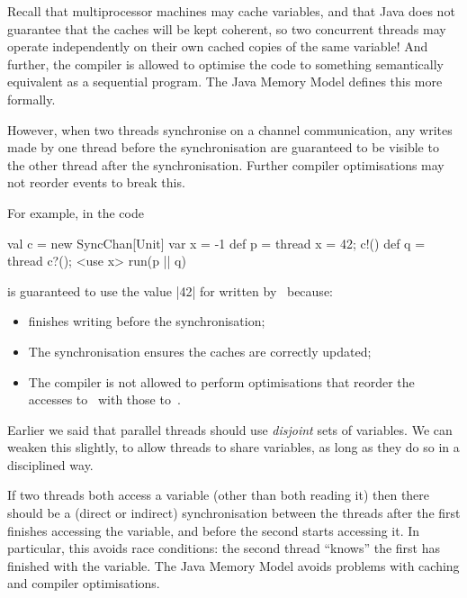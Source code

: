 


Recall that multiprocessor machines may cache variables, and that Java does
not guarantee that the caches will be kept coherent, so two concurrent
threads may operate independently on their own cached copies of the same
variable!  And further, the compiler is allowed to optimise the code to
something semantically equivalent as a sequential program.  The Java Memory
Model
defines this more formally.

However, when two threads synchronise on a channel communication, any writes
made by one thread before the synchronisation are guaranteed to be visible to
the other thread after the synchronisation.  
Further compiler optimisations may not reorder events to break this.



For example, in the code
\begin{scala}
val c = new SyncChan[Unit]
var x = -1
def p = thread{ x = 42; c!() }
def q = thread{ c?(); <use x> }
run(p || q)
\end{scala}
%
 is guaranteed to use the value |42| for  written
by~ because:
%
\begin{itemize}
\item 
{} finishes writing before the synchronisation;

\item
The synchronisation ensures the caches are correctly updated;

\item
The compiler is not allowed to perform optimisations that reorder the accesses
to~ with those to~.
\end{itemize}



Earlier we said that parallel threads should use \emph{disjoint} sets of
variables.  We can weaken this slightly, to allow threads to share
variables, as long as they do so in a disciplined way. 

If two threads both access a variable (other than both reading it) then
there should be a (direct or indirect) synchronisation between the threads
after the first finishes accessing the variable, and before the second starts
accessing it.  In particular, this avoids race conditions: the second thread
``knows'' the first has finished with the variable.  The Java Memory Model
avoids problems with caching and compiler optimisations.

